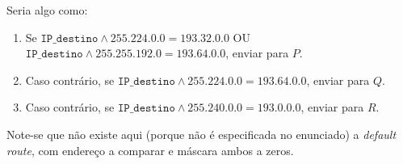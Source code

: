 \begin{enumerate}[leftmargin=\labelsep]
        Seria algo como:

        \begin{enumerate}
          \item Se $\texttt{IP\_destino} \wedge 255.224.0.0 = 193.32.0.0$ OU
                $\texttt{IP\_destino} \wedge 255.255.192.0 = 193.64.0.0$, enviar para $P$.
          \item Caso contrário, se $\texttt{IP\_destino} \wedge 255.224.0.0 = 193.64.0.0$,
                enviar para $Q$.
          \item Caso contrário, se $\texttt{IP\_destino} \wedge 255.240.0.0 = 193.0.0.0$, enviar para $R$.
        \end{enumerate}

        Note-se que não existe aqui (porque não é especificada no enunciado) a \textit{default route},
        com endereço a comparar e máscara ambos a zeros.
\end{enumerate}